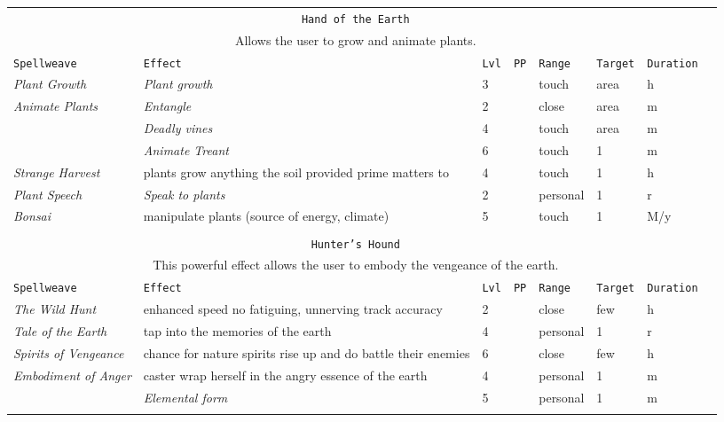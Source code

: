 \documentclass[10pt,a4paper]{article}
\begin{document}
\begin{table}[htbp!]
\begin{tabular}{llllllll}
   
   \multicolumn{7}{c}{\texttt{Hand of the Earth}}\\
  \multicolumn{7}{c}{Allows the user to grow and animate plants.}\\
    \hline
 \texttt{Spellweave} & \texttt{Effect} & \texttt{Lvl} & \texttt{PP} & \texttt{Range} & \texttt{Target} & \texttt{Duration} \\
    \hline
    \multirow{1}{*}{\textit{Plant Growth}} & \textit{Plant growth} & 3 && touch & area & h\\
    \hline
    \multirow{1}{*}{\textit{Animate Plants}} & \textit{Entangle} & 2 && close & area & m\\
    									     & \textit{Deadly vines} & 4 && touch & area & m\\
    									     & \textit{Animate Treant} & 6 && touch & 1 & m\\
    \hline
    \multirow{1}{*}{\textit{Strange Harvest}}& plants grow anything the soil provided prime matters to & 4 && touch & 1 & h\\
    \hline
    \multirow{1}{*}{\textit{Plant Speech}}& \textit{Speak to plants} & 2 && personal & 1 & r\\
    \hline
    \multirow{1}{*}{\textit{Bonsai}}& manipulate plants (source of energy, climate) & 5 && touch & 1 & M/y\\
	&&&&&&\\  
    
   
   \multicolumn{7}{c}{\texttt{Hunter's Hound}}\\
  \multicolumn{7}{c}{This powerful effect allows the user to embody the vengeance of the earth.}\\
    \hline
 \texttt{Spellweave} & \texttt{Effect} & \texttt{Lvl} & \texttt{PP} & \texttt{Range} & \texttt{Target} & \texttt{Duration} \\
    \hline
    \multirow{1}{*}{\textit{The Wild Hunt}}& enhanced speed no fatiguing, unnerving track accuracy & 2 && close & few & h\\
    \hline
    \multirow{1}{*}{\textit{Tale of the Earth}}& tap into the memories of the earth & 4 && personal & 1 & r\\
    \hline
    \multirow{1}{*}{\textit{Spirits of Vengeance}}& chance for nature spirits rise up and do battle their enemies & 6 && close & few & h\\
    \hline
    \multirow{1}{*}{\textit{Embodiment of Anger}}& caster wrap herself in the angry essence of the earth & 4 && personal & 1 & m\\
    											 & \textit{Elemental form} & 5 && personal & 1 & m\\
	&&&&&&\\
	
		
\end{tabular}
\end{table} 
\end{document}
